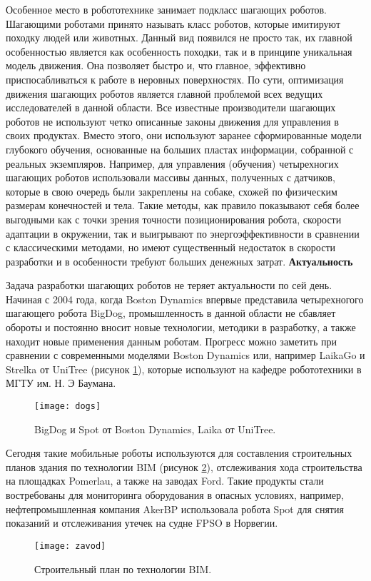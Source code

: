 Особенное место в робототехнике занимает подкласс шагающих роботов. Шагающими роботами принято называть класс роботов, которые имитируют походку людей или животных. Данный вид появился не просто так, их главной особенностью является как особенность походки, так и в принципе уникальная модель движения. Она позволяет быстро и, что главное, эффективно приспосабливаться к работе в неровных поверхностях. По сути, оптимизация движения шагающих роботов является главной проблемой всех ведущих исследователей в данной области. Все известные производители шагающих роботов не используют четко описанные законы движения для управления в своих продуктах. Вместо этого, они используют заранее сформированные модели глубокого обучения, основанные на больших пластах информации, собранной с реальных экземпляров. Например, для управления (обучения) четырехногих шагающих роботов использовали массивы данных, полученных с датчиков, которые в свою очередь были закреплены на собаке, схожей по физическим размерам конечностей и тела. Такие методы, как правило показывают себя более выгодными как с точки зрения точности позиционирования робота, скорости адаптации в окружении, так и выигрывают по энергоэффективности в сравнении с классическими методами, но имеют существенный недостаток в скорости разработки и в особенности требуют больших денежных затрат. 
\newpage
\textbf{Актуальность}


Задача разработки шагающих роботов не теряет актуальности по сей день. Начиная с 2004 года, когда Boston Dynamics впервые представила четырехногого шагающего робота BigDog, промышленность в данной области не сбавляет обороты и постоянно вносит новые технологии, методики в разработку, а также находит новые применения данным роботам. Прогресс можно заметить при сравнении с современными моделями Boston Dynamics или, например LaikaGo и Strelka от UniTree  (рисунок \ref{dogs}), которые используют на кафедре робототехники в МГТУ им. Н. Э Баумана.
\begin{figure}[h]
	\begin{center}
		\texttt{[image: dogs]}
		\caption{BigDog и Spot от Boston Dynamics, Laika от UniTree.}
		\label{dogs}
	\end{center}
\end{figure}

Сегодня такие мобильные роботы используются для составления строительных планов здания по технологии BIM (рисунок \ref{zavod}), отслеживания хода строительства на площадках Pomerlau, а также на заводах Ford. Такие продукты стали востребованы для мониторинга оборудования в опасных условиях, например, нефтепромышленная компания AkerBP использовала робота Spot для снятия показаний и отслеживания утечек на судне FPSO в Норвегии.

\newpage
\begin{figure}[h]
	\begin{center}
		\texttt{[image: zavod]}
		\caption{Строительный план по технологии BIM.}
		\label{zavod}
	\end{center}
\end{figure}